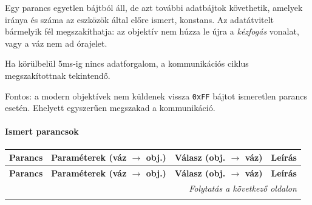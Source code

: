 Egy parancs egyetlen bájtból áll, de azt további adatbájtok követhetik, 
amelyek iránya és száma az eszközök által előre ismert, konstans.
Az adatátvitelt bármelyik fél megszakíthatja: az objektív nem húzza le újra a \textit{kézfogás} vonalat, vagy a váz nem ad órajelet. 

Ha körülbelül 5ms-ig nincs adatforgalom, a kommunikációs ciklus megszakítottnak tekintendő.

Fontos: a modern objektívek nem küldenek vissza \texttt{0xFF} bájtot 
ismeretlen parancs esetén. Ehelyett egyszerűen megszakad a kommunikáció.

\paragraph{Ismert parancsok}

\begin{longtable}{|c|p{3.5cm}|p{3.5cm}|p{5cm}|}
    \hline
    \rowcolor{lightgray}
    \textbf{Parancs} & 
    \textbf{Paraméterek (váz $\rightarrow$ obj.)} & 
    \textbf{Válasz (obj. $\rightarrow$ váz)} & 
    \textbf{Leírás} \\
    \hline
    \endfirsthead
    
    \hline
    \rowcolor{lightgray}
    \textbf{Parancs} & 
    \textbf{Paraméterek (váz $\rightarrow$ obj.)} & 
    \textbf{Válasz (obj. $\rightarrow$ váz)} & 
    \textbf{Leírás} \\
    \hline
    \endhead
    
    \hline
    \multicolumn{4}{r}{\textit{Folytatás a következő oldalon}} \\
    \endfoot
    
    \endlastfoot
    

\end{longtable}
